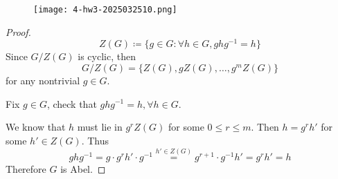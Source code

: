 \begin{exercise}
\begin{figure}[H]
\centering
\texttt{[image: 4-hw3-2025032510.png]}
\label{}
\end{figure}
\end{exercise}
\begin{proof}
\[
Z(G)\coloneqq \{ g\in G :\forall h\in G,ghg^{-1}=h\}
\]
Since $G/Z(G)$ is cyclic, then
\[
G/Z(G)=\{ Z(G),gZ(G),\dots,g^{m}Z(G) \}
\]
for any nontrivial $g\in G$.

Fix $g\in G$, check that $ghg^{-1}=h,\forall h\in G$.

We know that $h$ must lie in $g^{r}Z(G)$ for some $0\leq r\leq m$. Then $h=g^{r}h'$ for some $h'\in Z(G)$. Thus
\[
ghg^{-1}=g\cdot g^{r}h'\cdot g^{-1}\overset{ h'\in Z(G) }{ = }g^{r+1}\cdot g^{-1}h'=g^{r}h'=h
\]
Therefore $G$ is Abel.

\end{proof}

